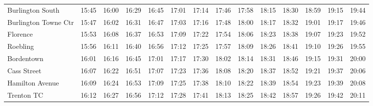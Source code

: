 \begin{center}
\begin{tabular}{@{}lrrrrrrrrrrrrr@{}}
Burlington South & 15:45 & 16:00 & 16:29 & 16:45 & 17:01 & 17:14 & 17:46 & 17:58 & 18:15 & 18:30 & 18:59 & 19:15 & 19:44 \\
Burlington Towne Ctr & 15:47 & 16:02 & 16:31 & 16:47 & 17:03 & 17:16 & 17:48 & 18:00 & 18:17 & 18:32 & 19:01 & 19:17 & 19:46 \\
Florence & 15:53 & 16:08 & 16:37 & 16:53 & 17:09 & 17:22 & 17:54 & 18:06 & 18:23 & 18:38 & 19:07 & 19:23 & 19:52 \\
Roebling & 15:56 & 16:11 & 16:40 & 16:56 & 17:12 & 17:25 & 17:57 & 18:09 & 18:26 & 18:41 & 19:10 & 19:26 & 19:55 \\
Bordentown & 16:01 & 16:16 & 16:45 & 17:01 & 17:17 & 17:30 & 18:02 & 18:14 & 18:31 & 18:46 & 19:15 & 19:31 & 20:00 \\
Cass Street & 16:07 & 16:22 & 16:51 & 17:07 & 17:23 & 17:36 & 18:08 & 18:20 & 18:37 & 18:52 & 19:21 & 19:37 & 20:06 \\
Hamilton Avenue & 16:09 & 16:24 & 16:53 & 17:09 & 17:25 & 17:38 & 18:10 & 18:22 & 18:39 & 18:54 & 19:23 & 19:39 & 20:08 \\
Trenton TC & 16:12 & 16:27 & 16:56 & 17:12 & 17:28 & 17:41 & 18:13 & 18:25 & 18:42 & 18:57 & 19:26 & 19:42 & 20:11 \\
\bottomrule\end{tabular}\end{center}
